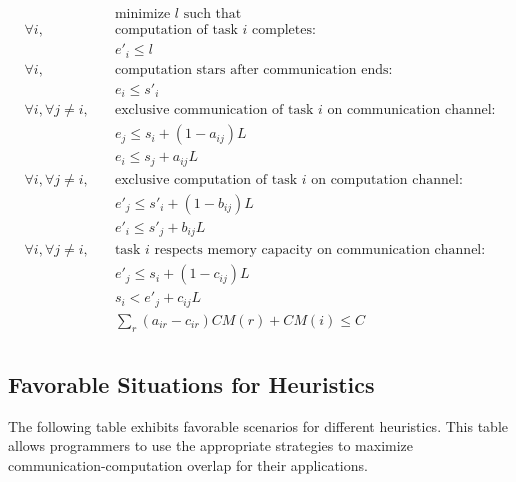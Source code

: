 \documentclass[sigconf]{acmart}
\begin{document}
	\vspace*{-0.5cm}
	\begin{align*}
		& \text{minimize } l \text{ such that }\\
		\forall i, \quad & \text{computation of task } i \text{ completes:}\\
		& e'_i \leq l\\
		\forall i, \quad & \text{computation stars after communication ends:}\\
		& e_i \leq s'_i\\
		\forall i, \forall j\ne i, \quad & \text{exclusive communication of task } i \text{ on communication channel:}\\
		& e_j \leq s_i +(1-a_{ij})L\\
		& e_i\leq s_j +a_{ij}L\\
		\forall i, \forall j\ne i, \quad & \text{exclusive computation of task } i \text{ on computation channel:}\\
		& e'_j \leq s'_i +(1-b_{ij})L\\
		& e'_i\leq s'_j +b_{ij}L\\
		\forall i, \forall j\ne i, \quad & \text{task } i \text{ respects memory capacity on communication channel:}\\
		& e'_j \leq s_i +(1-c_{ij})L\\
		& s_i< e'_j +c_{ij}L\\
		& \sum_r (a_{ir} - c_{ir})CM(r) + CM(i) \le C\\
	\end{align*} 
	
	\subsection{Favorable Situations for Heuristics}
	\noindent The following table exhibits favorable scenarios for different heuristics. This table allows programmers to use the appropriate strategies to maximize communication-computation overlap for their applications.
	
\end{document}

